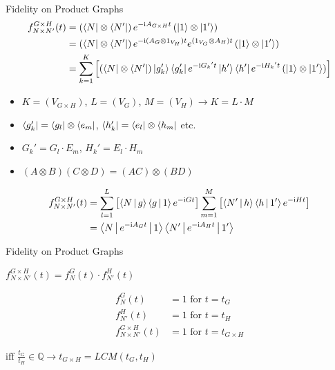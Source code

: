 \documentclass{beamer}
\begin{document}
\begin{frame}{Fidelity on Product Graphs}
	\begin{align*}
		f^{G\times H}_{N\times N'}(t) &= \left( \bra{N} \otimes \bra{N'} \right)e^{-\text{i}A_{G\times H}t} \left( \ket{1} \otimes \ket{1'} \right) \\
		&= \left( \bra{N} \otimes \bra{N'} \right)e^{-\text{i}(A_G \otimes \text{1}_{V_H})t} e^{(\text{1}_{V_G} \otimes A_H)t} \left( \ket{1} \otimes \ket{1'} \right) \\
		&= \sum_{k=1}^{K}\left[ \left( \bra{N} \otimes \bra{N'} \right) \ket{g'_k}\bra{g'_k}e^{-\text{i}G_k{}'t} \ket{h'}\bra{h'}e^{-\text{i}H_k{}'t} \left( \ket{1} \otimes \ket{1'} \right) \right]
	\end{align*}
	\begin{itemize}
		\item $K = (V_{G\times H})$, $L = (V_G)$, $M = (V_H) \rightarrow K = L\cdot M$
		\item $\bra{g'_k} = \bra{g_l} \otimes \bra{e_m}$, $\bra{h'_k} = \bra{e_l} \otimes \bra{h_m}$ etc.
		\item $G_k{}' = G_l\cdot E_m$, $H_k{}' = E_l\cdot H_m$
		\item $(A\otimes B)(C\otimes D) = (AC)\otimes (BD)$
	\end{itemize}
	\begin{align*}
		f^{G\times H}_{N\times N'}(t) &= \sum_{l=1}^L\left[ \Braket{N|g}\Braket{g|1}e^{-\text{i}Gt} \right] \sum_{m=1}^M\left[ \Braket{N'|h}\Braket{h|1'}e^{-\text{i}Ht} \right] \\
		&= \Braket{N|e^{-\text{i}A_G t}|1}\Braket{N'|e^{-\text{i}A_H t}|1'}
	\end{align*}
\end{frame}

\begin{frame}[t]{Fidelity on Product Graphs}
	\begin{exampleblock}{}
	\setlength\abovedisplayskip{-8pt}
	\begin{center}
		$ f^{G\times H}_{N\times N'}(t) = f^G_N(t)\cdot f^H_{N'}(t) $
	\end{center}
	\end{exampleblock}
	\begin{align*}
		f^G_N(t) &= 1 \text{ for } t = t_G \\ 
		f^H_{N'}(t) &= 1 \text{ for } t = t_H \\ 
		f^{G\times H}_{N\times N'}(t) &= 1 \text{ for } t = t_{G\times H}
	\end{align*}
	\begin{exampleblock}{}
	\setlength\abovedisplayskip{-8pt}
	\begin{center}
		$ \text{iff }\frac{t_G}{t_H} \in \mathbb{Q} \rightarrow t_{G\times H} = LCM(t_G,t_H) $
	\end{center}
	\end{exampleblock}
\end{frame}
\end{document}
